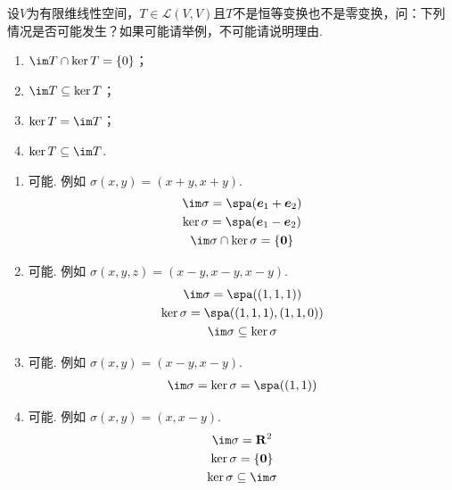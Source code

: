 \begin{exercise}
\begin{exgroup}
        \item 设$V$为有限维线性空间，$T\in \mathcal{L}(V,V)$且$T$不是恒等变换也不是零变换，问：下列情况是否可能发生？如果可能请举例，不可能请说明理由.
        \begin{enumerate}
            \item $\im T \cap \ker T = \{0\}$；

            \item $\im T \subseteq \ker T$；

            \item $\ker T = \im T$；

            \item $\ker T \subseteq \im T$.
        \end{enumerate}

        \begin{answer}
            \begin{enumerate}
                \item 可能. 例如 $ \sigma(x, y) = (x + y, x + y) $.
                      \begin{gather*}
                          \im \sigma = \spa(\vec{e}_1 + \vec{e}_2) \\
                          \ker \sigma = \spa(\vec{e}_1 - \vec{e}_2) \\
                          \im \sigma \cap \ker \sigma = \{\vec{0}\}
                      \end{gather*}

                \item 可能. 例如 $ \sigma(x, y, z) = (x - y, x - y, x - y) $.
                      \begin{gather*}
                          \im \sigma = \spa((1, 1, 1)) \\
                          \ker \sigma = \spa((1, 1, 1), (1, 1, 0)) \\
                          \im \sigma \subseteq \ker \sigma
                      \end{gather*}

                \item 可能. 例如 $ \sigma(x, y) = (x - y, x - y) $.
                      \begin{gather*}
                          \im \sigma = \ker \sigma = \spa((1, 1))
                      \end{gather*}

                \item 可能. 例如 $ \sigma(x, y) = (x, x - y) $.
                      \begin{gather*}
                          \im \sigma = \mathbf{R}^2 \\
                          \ker \sigma = \{\vec{0}\} \\
                          \ker \sigma \subseteq \im \sigma
                      \end{gather*}
            \end{enumerate}
        \end{answer}


\end{exgroup}
\end{exercise}
